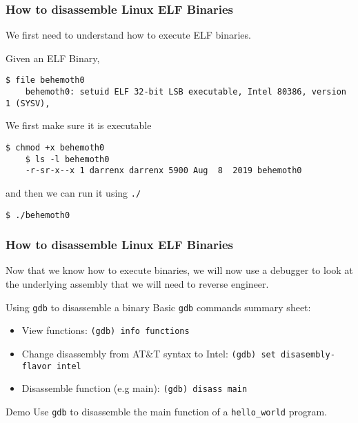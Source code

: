 \documentclass{beamer}
\begin{document}
\begin{frame}[fragile]
  \frametitle{How to disassemble Linux ELF Binaries}
  We first need to understand how to execute ELF binaries.
  \begin{example}
    Given an ELF Binary,
    \begin{lstlisting}[basicstyle=\small\ttfamily]
    $ file behemoth0
    behemoth0: setuid ELF 32-bit LSB executable, Intel 80386, version 1 (SYSV),
    \end{lstlisting}
    We first make sure it is executable
    \begin{lstlisting}[basicstyle=\small\ttfamily]
    $ chmod +x behemoth0
    $ ls -l behemoth0
    -r-sr-x--x 1 darrenx darrenx 5900 Aug  8  2019 behemoth0
    \end{lstlisting}
    and then we can run it using \texttt{./}
    \begin{lstlisting}[basicstyle=\small\ttfamily]
    $ ./behemoth0

    \end{lstlisting}
  \end{example}
\end{frame}
\begin{frame}
  \frametitle{How to disassemble Linux ELF Binaries}
  Now that we know how to execute binaries, we will now use a debugger to
  look at the underlying assembly that we will need to reverse engineer.
  \begin{block}{Using \texttt{gdb} to disassemble a binary}
    Basic \texttt{gdb} commands summary sheet:
    \begin{itemize}
      \item View functions: \texttt{(gdb) info functions}
      \item Change disassembly from AT\&T syntax to Intel:
      \texttt{(gdb) set disasembly-flavor intel}
      \item Disassemble function (e.g main): \texttt{(gdb) disass main}
    \end{itemize}
  \end{block}
  \begin{exampleblock}{Demo}
    Use \texttt{gdb} to disassemble the main function of a \texttt{hello\_world}
    program.
  \end{exampleblock}
\end{frame}
\end{document}
